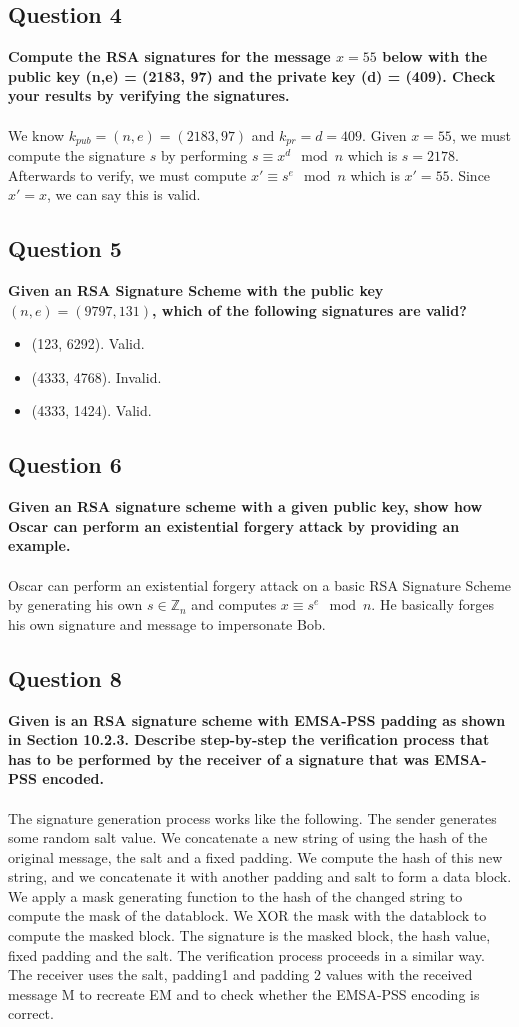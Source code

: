 \documentclass[titlepage]{article}
\begin{document}
{\subsection{Question 4}
{
\textbf{Compute the RSA signatures for the message \(x = 55\) below with the public key (n,e) = (2183, 97) and the private key (d) = (409). Check your results by verifying the signatures.}\\\\
We know \(k_{pub} = (n,e) = (2183, 97)\) and \(k_{pr} = d = 409\). Given \(x = 55\), we must compute the signature \(s\) by performing \(s \equiv x^d \mod n\) which is \(s = 2178\). Afterwards to verify, we must compute \(x' \equiv s^e \mod n\) which is \(x' = 55\). Since \(x' = x\), we can say this is valid.
}
\subsection{Question 5}
{
\textbf{Given an RSA Signature Scheme with the public key \((n, e) = (9797, 131)\), which of the following signatures are valid?}
\begin{itemize}
    \item (123, 6292). Valid.
    \item (4333, 4768). Invalid.
    \item (4333, 1424). Valid.
\end{itemize}
}
\subsection{Question 6}
{
\textbf{Given an RSA signature scheme with a given public key, show how Oscar can perform an existential forgery attack by providing an example.}\\\\
Oscar can perform an existential forgery attack on a basic RSA Signature Scheme by generating his own \(s \in \mathbb{Z}_n\) and computes \(x \equiv s^e \mod n\). He basically forges his own signature and message to impersonate Bob.
}
\subsection{Question 8}
{
\textbf{Given is an RSA signature scheme with EMSA-PSS padding as shown in Section 10.2.3. Describe step-by-step the verification process that has to be performed by the receiver of a signature that was EMSA-PSS encoded.}\\\\
The signature generation process works like the following. The sender generates some random salt value. We concatenate a new string of using the hash of the original message, the salt and a fixed padding. We compute the hash of this new string, and we concatenate it with another padding and salt to form a data block. We apply a mask generating function to the hash of the changed string to compute the mask of the datablock. We XOR the mask with the datablock to compute the masked block. The signature is the masked block, the hash value, fixed padding and the salt. The verification process proceeds in a similar way. The receiver uses the salt, padding1 and padding 2 values with the received message M to recreate EM and to check whether the EMSA-PSS encoding is correct. 
}
\clearpage
}
\end{document}
